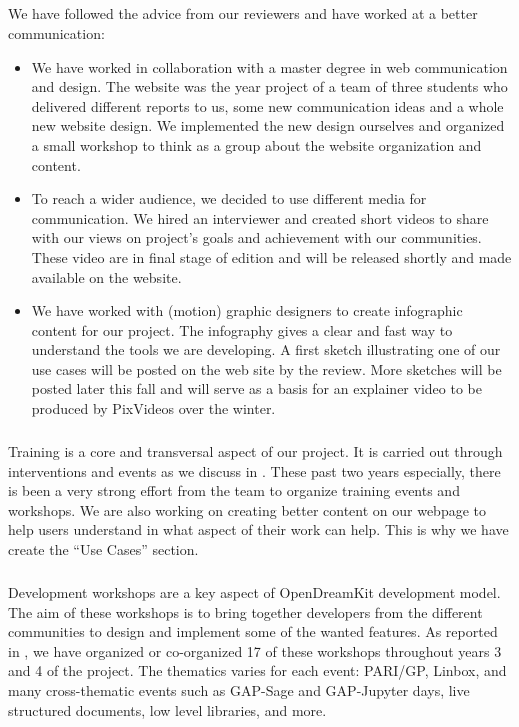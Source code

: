 \subparagraph{}
\label{dissem@dissemination-communication}

We have followed the advice from our reviewers and have worked at a better communication:
\begin{itemize}
\item We have worked in collaboration with a master degree in web communication and design. The
\ODK website was the year project of a team of three students who delivered different reports to us, some
new communication ideas and a whole new website design. We implemented the new design ourselves and
organized a small workshop to think as a group about the website organization and content.
\item To reach a wider audience, we decided to use different media for communication. We hired an interviewer
and created short videos to share with our views on project's goals and achievement with our communities. These
video are in final stage of edition and will be released shortly and made available on the website.

\item We have worked with (motion) graphic designers to create
  infographic content for our project. The infography gives a clear
  and fast way to understand the tools we are developing. A first
  sketch illustrating one of our use cases will be posted on the web
  site by the review. More sketches will be posted later this fall and
  will serve as a basis for an explainer video to be produced by
  PixVideos over the winter.
\end{itemize}

\subparagraph{}

Training is a core and transversal aspect of our project. It is carried out
through interventions and events as we discuss in . These
past two years especially, there is been a very strong effort from the \ODK team to organize
training events and workshops. We are also working on creating better content on our webpage
to help users understand in what aspect of their work can \ODK help. This is why we have create the
``Use Cases'' section.

\subparagraph{}
\label{dissem@devel-workshops}

Development workshops are a key aspect of OpenDreamKit development model. The aim of these workshops is to bring together developers from the different communities to design and implement some
of the wanted features. As reported in , we have organized
or co-organized 17  of these workshops throughout years 3 and 4 of the project. The thematics varies
for each event: PARI/GP, Linbox, and many cross-thematic events such as GAP-Sage and GAP-Jupyter days,
live structured documents, low level libraries, and more.

